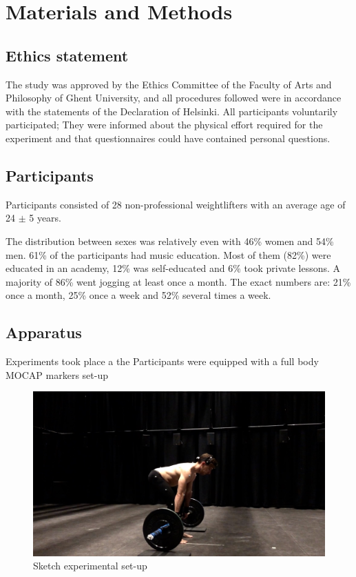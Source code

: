 \documentclass[10pt,letterpaper]{article}
\begin{document}
\section*{Materials and Methods} \label{sec:materials_methods}
\subsection*{Ethics statement}
The study was approved by the Ethics Committee of the Faculty of Arts and Philosophy of Ghent University, and all procedures followed were in accordance with the statements of the Declaration of Helsinki. All participants voluntarily participated; They were informed about the physical effort required for the experiment and that questionnaires could have contained personal questions.

\subsection*{Participants}
Participants consisted of 28 non-professional weightlifters with an average age of 24 $\pm$ 5 years. 

The distribution between sexes was relatively even with 46\% women and 54\% men. 61\% of the participants had music education. Most of them (82\%) were educated in an academy, 12\% was self-educated and 6\% took private lessons. A majority of 86\% went jogging at least once a month. The exact numbers are: 21\% once a month, 25\% once a week and 52\% several times a week. 

\subsection*{Apparatus}\label{sec:apparatus}
Experiments took place a the 
Participants were equipped with a full body MOCAP markers set-up
\begin{figure}[!h]
\center
\includegraphics[width=.8\textwidth]{figures/promo1_deadlift.jpg}
\caption{Sketch experimental set-up}
\label{fig:set-up}      
\end{figure}
\end{document}
